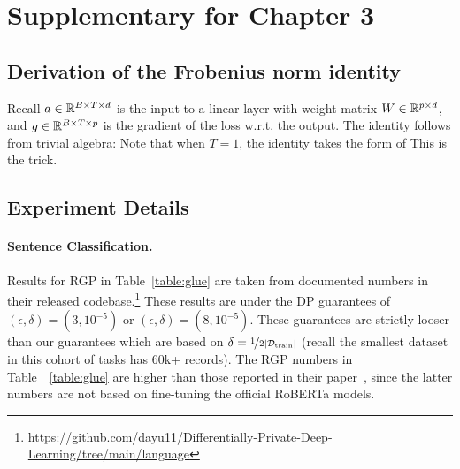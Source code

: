 \appendix
\chaptermark{}
\section{Supplementary for Chapter 3}

\subsection{Derivation of the Frobenius norm identity} \label{app:frobenius}
Recall $a \in \mathbb{R}^{B\times T \times d}$ is the input to a linear layer with weight matrix $W \in \mathbb{R}^{p \times d}$, and $g \in \mathbb{R}^{B \times T \times p}$ is the gradient of the loss w.r.t. the output. The identity follows from trivial algebra:
Note that when $T=1$, the identity takes the form of 
This is the \cite{goodfellow2015efficient} trick.

\newpage
\subsection{Experiment Details}\label{app:experiments_main}

\paragraph{Sentence Classification.}
Results for RGP in Table~\ref{table:glue} are taken from documented numbers in their released codebase.\footnote{\url{https://github.com/dayu11/Differentially-Private-Deep-Learning/tree/main/language}}
These results are under the DP guarantees of $(\epsilon, \delta)=(3, 10^{-5})$ or $(\epsilon, \delta)=(8, 10^{-5})$.
These guarantees are strictly looser than our guarantees which are based on $\delta=\nicefrac{1}{2 |\mathcal{D}_\text{train}|}$ (recall the smallest dataset in this cohort of tasks has $60$k+ records).
The RGP numbers in Table~~\ref{table:glue} are higher than those reported in their paper~\citep{yu2021large}, since the latter numbers are not based on fine-tuning the official RoBERTa models.

